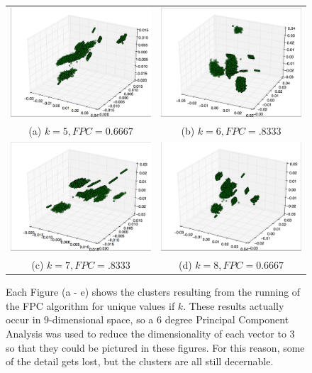 \documentclass[letterpaper, 12pt]{article}
\begin{document}
\begin{figure}[H]
\centering
\caption{\label{clusterfig} Each Figure (a - e) shows the clusters resulting from the running of the FPC algorithm for unique values if $k$. These results actually occur in 9-dimensional space, so a 6 degree Principal Component Analysis was used to reduce the dimensionality of each vector to 3 so that they could be pictured in these figures. For this reason, some of the detail gets lost, but the clusters are all still decernable.}
\begin{tabular}{cc}
  \includegraphics[width=65mm]{k5} &   \includegraphics[width=65mm]{k6} \\
(a) $k = 5, FPC = 0.6667$ & (b) $k = 6, FPC = .8333$ \\[6pt]
 \includegraphics[width=65mm]{k7} &   \includegraphics[width=65mm]{k8} \\
(c) $k = 7, FPC = .8333$ & (d) $k = 8, FPC =  0.6667$ \\[6pt]
\end{tabular}
\end{figure}
\end{document}
